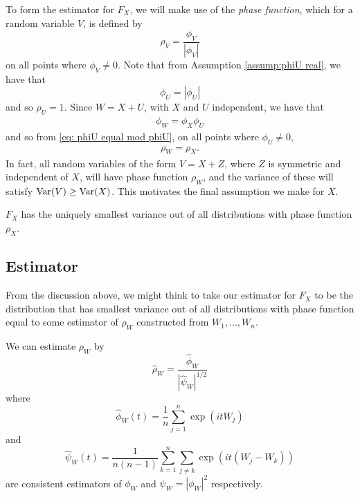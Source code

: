 	To form the estimator for $F_X$, we will make use of the \emph{phase function}, which for a random variable $V$, is defined by
	\begin{equation}
		\rho_V = \frac{\phi_V}{|\phi_V|}
	\end{equation}
	on all points where $\phi_V \neq 0$.
	Note that from Assumption \ref{assump:phiU real}, we have that 
	\begin{equation}
	\label{eq: phiU equal mod phiU}
		\phi_U = |\phi_U|
	\end{equation}
	and so $\rho_U = 1$.
	Since $W = X+U$, with $X$ and $U$ independent, we have that
	\begin{align}
		\phi_W = \phi_X \phi_U
	\end{align}
	and so from \eqref{eq: phiU equal mod phiU}, on all points where $\phi_U \neq 0$,
	\begin{align}
		\rho_W = \rho_X.
	\end{align}
	In fact, all random variables of the form $V = X + Z$, where $Z$ is symmetric and independent of $X$, will have phase function $\rho_W$, and the variance of these will satisfy $\mathrm{Var}(V) \geq \mathrm{Var}(X)$. This motivates the final assumption we make for $X$.

	\begin{assumption}
	\label{assump:X has smallest variance}
		$F_X$ has the uniquely smallest variance out of all distributions with phase function $\rho_X$.
	\end{assumption}

	\subsection{Estimator}
	\label{sec:deconvolution estimator}
	From the discussion above, we might think to take our estimator for $F_X$ to be the distribution that has smallest variance out of all distributions with phase function equal to some estimator of $\rho_W$ constructed from $W_1, \dots, W_n$.


	We can estimate $\rho_W$ by
	\begin{equation}
		\hat{\rho}_W = \frac{\hat{\phi}_W}{\left|\hat{\psi}_W\right|^{1/2}}
	\end{equation}
	where
	\begin{equation}
	\label{eq:define hat phi W}
		\hat{\phi}_W(t) = \frac{1}{n}\sum_{j = 1}^n \exp(it W_j)
	\end{equation}
	and 
	\begin{equation}
	\label{eq:define hat psi W}
		\hat{\psi}_W(t) = \frac{1}{n(n-1)} \sum_{k=1}^n \sum_{j \neq k} \exp(it (W_j - W_k))
	\end{equation}
	are consistent estimators of $\phi_W$ and $\psi_W = |\phi_W|^2$ respectively.

